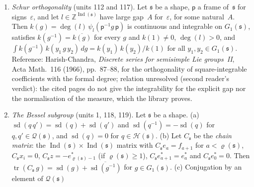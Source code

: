 \documentclass[11pt,a4paper]{article}
\newcommand{\kw}[1]{\emph{#1}}
\newcommand{\m}[1]{\mbox{$#1$}}        %
\theoremstyle{plainx}
\theoremstyle{uprightx}
\newcommand{\RR}{\mathbb{R}}
\newcommand{\ZZ}{\mathbb{Z}}
\newcommand{\fs}{\mathfrak{s}}
\newcommand{\fp}{\mathsf{p}}
\newcommand{\abs}[1]{\lvert #1\rvert}
\newcommand{\op}[1]{\lVert #1\rVert_{\mathrm{op}}}
\newcommand{\tr}{\operatorname{tr}}
\newcommand{\Us}[1]{\mathrm{U}(#1)}                      %
\newcommand{\dsc}[2]{\psi_{#1}(#2)}                      %
\newcommand{\fdeg}[1]{\deg(#1)}                          %
\newcommand{\rhs}[1]{\varrho(#1)}                        %
\newcommand{\Ind}[1]{\operatorname{Ind}(#1)}             %
\newcommand{\Gone}[1]{G_{1}(#1)}                         %
\newcommand{\Hh}[1]{\mathcal{H}(#1)}                     %
\newcommand{\Qq}[1]{\mathcal{Q}(#1)}                     %
\newcommand{\sd}[1]{\operatorname{sd}(#1)}               %
\begin{document}
\begin{enumerate}[label=\textup{(I\arabic*)},leftmargin=2.7em,itemsep=2.5pt]
  and Gross for the volume growth and has no place: reference to be confirmed). Let \m{\Omega\ne\emptyset}, let $\mathfrak{g}$ be a
  group with a topology, its Borel $\sigma$-algebra and measurable translations, $\nu$ a right-invariant measure
  on~$\mathfrak{g}$, \m{j\colon \mathfrak{g}\to\Us{\varepsilon}} a homomorphism and \m{y\in\Us{\varepsilon}}. (a) For real \m{D,R\ge1} and
  \m{K\ge3DR^{2}}:
  $\nu\{\op{j(\sigma)y}\le R\}\le K^{2\abs{\Omega}^{2}}\,\nu\{\op{j(\sigma)-1}\le D^{-1}\}$. (b) If $j$ is proper and
  $\nu$ is finite on compact sets, then $\nu\{\op{j(\sigma)-1}\le R\}<\infty$ for every~$R$, and for every natural
  \m{c>8\abs{\Omega}^{2}} the function $\sigma\mapsto(2/\op{j(\sigma)y})^{c}$ is $\nu$-integrable with
  $\int(2/\op{j(\sigma)y})^{c}\,d\nu\le16^{c}\,\nu\{\op{j(\sigma)-1}\le1\}$. (c) If $\nu$ is positive on non-empty open
  sets and \m{f\colon \mathfrak{g}\to\RR} is continuous with \m{f(1)<R}, then \m{\nu\{f\le R\}\ne0}. (d) \m{\op{g}\ge1} and
  \m{\op{g^{-1}}=\op{g}} for \m{g\in\Us{\varepsilon}}, and \m{g\mapsto g\oplus1} is a proper map from $\Us{\varepsilon}$ to
  \m{\Us{\varepsilon\oplus1}} (unit 43).
\item \emph{Schur orthogonality} (units 112 and 117). Let $\fs$ be a shape, $\fp$ a frame of~$\fs$ for signs~$\varepsilon$,
  and let \m{l\in\ZZ^{\Ind{\fs}}} have large gap~$A$ for~$\varepsilon$, for some natural~$A$. Then
  $k(g)=\fdeg{l}\,\dsc{l}{\fp^{-1}g\,\fp}$ is continuous and integrable on $\Gone{\fs}$, satisfies
\m{k(g^{-1})=\overline{k(g)}} for every $g$ and \m{k(1)\neq0}, \m{\fdeg{l}>0}, and
  $\int k(g^{-1})\,k(y_1\,g\,y_2)\,dg=k(y_1)\,k(y_2)/k(1)$ for all \m{y_1,y_2\in\Gone{\fs}}. Reference:
  Harish-Chandra, \emph{Discrete series for semisimple Lie groups~II}, Acta Math.\ 116 (1966), pp.~87--88, for the
  orthogonality of square-integrable coefficients with the formal degree; relation unresolved (second reader's
  verdict): the cited pages do not give the integrability for the explicit gap nor the normalisation of the
  measure, which the library proves.
\item \emph{The Bessel subgroup} (units 1, 118, 119). Let $\fs$ be a shape. (a) $\sd{q\,q'}=\sd{q}+\sd{q'}$ and
  \m{\sd{q^{-1}}=-\sd{q}} for \m{q,q'\in\Qq{\fs}}, and \m{\sd{q}=0} for \m{q\in\Hh{\fs}}. (b) Let $C_{\fs}$ be the \kw{chain
  matrix}: the \m{\Ind{\fs}\times\Ind{\fs}} matrix with \m{C_{\fs}e_a=f_{a+1}} for \m{a<\rhs{\fs}}, \m{C_{\fs}x_i=0},
  \m{C_{\fs}z=-e^{*}_{\rhs{\fs}-1}} (if \m{\rhs{\fs}\ge1}), \m{C_{\fs}e^{*}_{a+1}=e^{*}_{a}} and \m{C_{\fs}e^{*}_0=0}. Then
  $\tr(C_{\fs}\,g)=\sd{g}+\overline{\sd{g^{-1}}}$ for \m{g\in\Gone{\fs}}. (c) Conjugation by an element of $\Qq{\fs}$

\end{enumerate}
\end{document}
